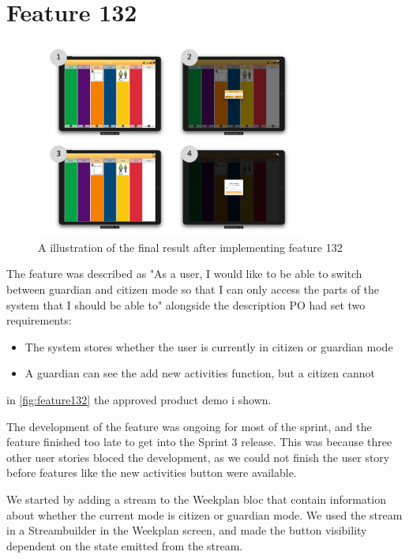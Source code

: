\section{Feature 132}
\begin{figure}[h]
    \centering
    \includegraphics[width=0.8\textwidth]{figures/feature_132.pdf}
    \caption{A illustration of the final result after implementing feature 132}
    \label{fig:feature132}
\end{figure}

The feature was described as "As a user, I would like to be able to switch between guardian and citizen mode so that I can only access the parts of the system that I should be able to" alongside the description \gls{PO} had set two requirements:

\begin{itemize}
  \item The system stores whether the user is currently in citizen or guardian mode
  \item A guardian can see the add new activities function, but a citizen cannot
\end{itemize}
in \autoref{fig:feature132} the approved product demo i shown.

The development of the feature was ongoing for most of the sprint, and the feature finished too late to get into the Sprint 3 release. This was because three other user stories bloced the development, as we could not finish the user story before features like the new activities button were available.

We started by adding a stream to the Weekplan \gls{bloc} that contain information about whether the current mode is citizen or guardian mode. We used the stream in a Streambuilder in the Weekplan screen, and made the button visibility dependent on the state emitted from the stream.

